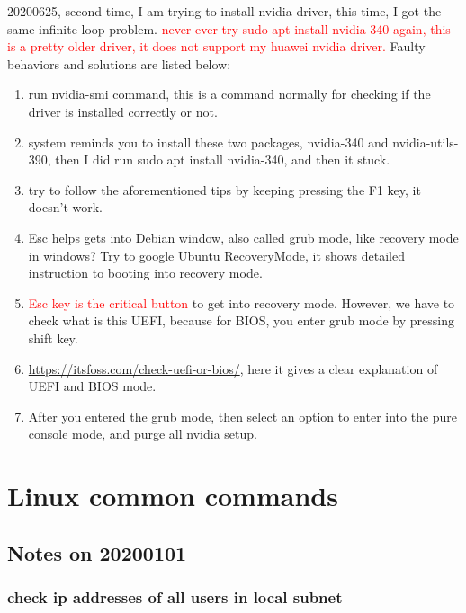 \documentclass[UTF8,fancyhdr,a4paper]{ctexart}
\newcommand{\pflred}[1]{\textcolor{red}{#1}}
\begin{document}
20200625, second time, I am trying to install nvidia driver, this time, I got the same infinite loop problem. \pflred{never ever try sudo apt install nvidia-340 again, this is a pretty older driver, it does not support my huawei nvidia driver.} Faulty behaviors and solutions are listed below:
\begin{enumerate}
      \item run nvidia-smi command, this is a command normally for checking if the driver is installed correctly or not.
      \item system reminds you to install these two packages, nvidia-340 and nvidia-utils-390, then I did run sudo apt install nvidia-340, and then it stuck.
      \item try to follow the aforementioned tips by keeping pressing the F1 key, it doesn't work.
      \item Esc helps gets into Debian window, also called grub mode, like recovery mode in windows? Try to google Ubuntu RecoveryMode, it shows detailed instruction to booting into recovery mode.
      \item \pflred{Esc key is the critical button} to get into recovery mode. However, we have to check what is this UEFI, because for BIOS, you enter grub mode by pressing shift key.
      \item \url{https://itsfoss.com/check-uefi-or-bios/}, here it gives a clear explanation of UEFI and BIOS mode. 
      \item After you entered the grub mode, then select an option to enter into the pure console mode, and purge all nvidia setup.
\end{enumerate}





\section{Linux common commands}

\subsection{Notes on 20200101}

\subsubsection{check ip addresses of all users in local subnet}
\end{document}
